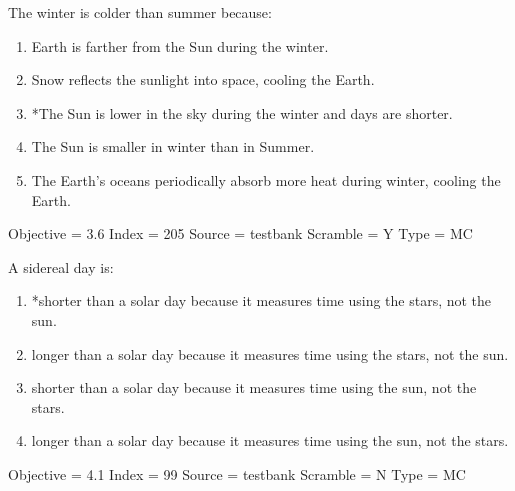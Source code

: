 \documentclass[11pt]{article}
\begin{document}
\begin{enumerate}
\begin{minipage}{\textwidth}
\begin{minipage}{\textwidth}
\item The winter is colder than summer because:
\begin{enumerate} 
\setlength{\itemsep}{1pt} 
\setlength{\parskip}{0pt} 
\setlength{\parsep}{0pt}
\setlength{\multicolsep}{1pt} 
\item Earth is farther from the Sun during the winter.
\item Snow reflects the sunlight into space, cooling the Earth.
\item *The Sun is lower in the sky during the winter and days are shorter.
\item The Sun is smaller in winter than in Summer.
\item The Earth's oceans periodically absorb more heat during winter, cooling the Earth.
\end{enumerate} 
Objective = 3.6
Index = 205
Source = testbank
Scramble = Y
Type = MC
\end{minipage}
\end{minipage}
\vskip 0.20in

\begin{minipage}{\textwidth}
\begin{minipage}{\textwidth}
\item A sidereal day is:
\begin{enumerate} 
\setlength{\itemsep}{1pt} 
\setlength{\parskip}{0pt} 
\setlength{\parsep}{0pt}
\setlength{\multicolsep}{1pt} 
\item *shorter than a solar day because it measures time using the stars, not the sun.
\item longer than a solar day because it measures time using the stars, not the sun.
\item shorter than a solar day because it measures time using the sun, not the stars.
\item longer than a solar day because it measures time using the sun, not the stars.
\end{enumerate} 
Objective = 4.1
Index = 99
Source = testbank
Scramble = N
Type = MC
\end{minipage}
\end{minipage}
\vskip 0.20in


\end{enumerate}
\end{document}
